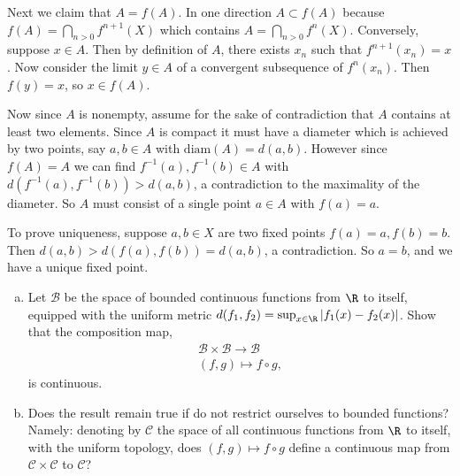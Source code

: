 \documentclass[11pt,letterpaper]{article}
\begin{document}
\begin{solution}
    Next we claim that $A=f(A)$. In one direction $A \subset f(A)$ because $f(A)=\bigcap_{n>0} f^{n+  1}(X)$ which contains $A=\bigcap_{n>0}f^n(X)$. Conversely, suppose $x\in A$. Then by definition of $A$, there exists $x_n$ such that $f^{n+1}(x_n)=x$. Now consider the limit $y\in A$ of a convergent subsequence of $f^n(x_n)$. Then $f(y)=x$, so $x\in f(A)$.

    Now since $A$ is nonempty, assume for the sake of contradiction that $A$ contains at least two elements. Since $A$ is compact it must have a diameter which is achieved by two points, say $a,b\in A$ with $\textrm{diam}(A)=d(a,b)$. However since $f(A)=A$ we can find $f^{-1}(a), f^{-1}(b)\in A$ with $d(f^{-1}(a), f^{-1}(b)) > d(a,b)$, a contradiction to the maximality of the diameter. So $A$ must consist of a single point $a\in A$ with $f(a)=a$.
    
    To prove uniqueness, suppose $a,b\in X$ are two fixed points $f(a)=a, f(b)=b$. Then $d(a,b) > d(f(a), f(b))=d(a,b)$, a contradiction. So $a=b$, and we have a unique fixed point.   
\end{solution}

\begin{problem}\noindent
    \begin{enumerate}[(a)]
        \item Let $\mathcal{B}$ be the space of bounded continuous functions from $\R$ to
        itself, equipped with the uniform metric $d(f_1,f_2)=\sup_{x\in \R} |f_1(x)-f_2(x)|$.  Show that the composition map,
        \begin{eqnarray*}
            \mathcal{B}\times \mathcal{B}\to \mathcal{B}\\
            (f,g)\mapsto f\circ g,
        \end{eqnarray*}
        is continuous.
        \item Does the result remain true if do not restrict ourselves to bounded functions? Namely: denoting by $\mathcal{C}$ the space of all continuous functions from $\R$ to itself, with the uniform topology, does $(f,g)\mapsto f\circ g$ define a continuous map from $\mathcal{C}\times \mathcal{C}$ to $\mathcal{C}$?
    \end{enumerate}
\end{problem}
\end{document}
